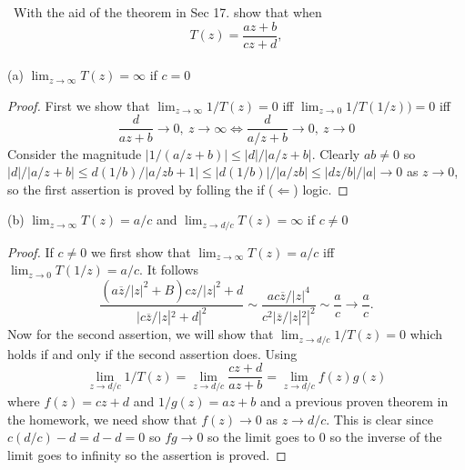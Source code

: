 \documentclass[11pt]{amsart}
\theoremstyle{definition}
\numberwithin{theorem}{section}
\numberwithin{definition}{section}
\numberwithin{equation}{section}
\begin{document}
\medskip {}\ With the aid of the theorem in Sec 17. show that when \begin{equation*}
  T(z) = \frac{az + b}{cz + d},
\end{equation*}\\
\noindent (a) $\lim_{z\to \infty} T(z) = \infty$ if $c = 0$
\begin{proof}
  First we show that $\lim_{z \to \infty} 1/T(z) = 0$ iff $\lim_{z \to 0} 1/T(1/z)) = 0$ iff
  \begin{equation*}
    \frac{d}{az + b} \to 0,\ z \to\infty \iff \frac{d}{a/z + b} \to 0,\  z \to 0
  \end{equation*}
  Consider the magnitude $|1/(a/z +b)| \leq |d|/|a/z + b|$. Clearly $ab \neq 0$ so $ |d|/|a/z + b| \leq d(1/b)/|a/zb + 1| \leq |d(1/b)|/|a/zb| \leq |dz/b|/|a| \to 0$ as $z \to 0$, so the first assertion is proved by folling the if ($\Leftarrow$) logic.
\end{proof}
\noindent (b) $\lim_{z\to \infty} T(z) = a/c$ and $\lim_{z\to d/c} T(z) = \infty$ if $c \neq 0$
\begin{proof}
  If $c \neq 0$ we first show that $\lim_{z \to \infty} T(z) = a/c $ iff $\lim_{z \to 0} T(1/z) = a/c.$ It follows 
  \begin{equation*}
    \frac{(a\overline{z}/|z|^2 +B)cz/|z|^2 +d}{|c \overline{z}/|z|^2 + d|^2} \sim \frac{ac \overline{z}/|z|^4}{c^2| \overline{z}/|z|^2|^2} \sim \frac{a}{c} \to \frac{a}{c}.
  \end{equation*}
  Now for the second assertion, we will show that $\lim_{z \to d/c} 1/T(z) = 0$  which holds if and only if the second assertion does. Using 
  \begin{equation*}
    \lim_{z \to d/c} 1/T(z) = \lim_{z \to d/c} \frac{cz + d}{az + b} = \lim_{z \to d/c} f(z)g(z)
  \end{equation*}
  where $f(z) = cz +d$ and $1/g(z) = az+b$ and a previous proven theorem in the homework, we need show that $f(z) \to 0$ as $z \to d/c$. This is clear since $c(d/c) -d = d- d = 0$ so $fg \to 0$ so the limit goes to $0$ so the inverse of the limit goes to infinity so the assertion is proved.
\end{proof}
\end{document}
